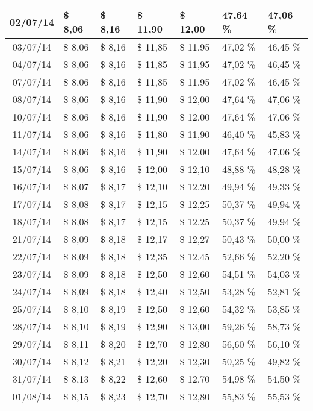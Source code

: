 \begin{center}
\begin{longtable}{|c|p{1.5cm}|p{1.5cm}|p{1.5cm}|p{1.5cm}|p{1.5cm}|p{1.5cm}|}
02/07/14 & \$ 8,06 & \$ 8,16 & \$ 11,90 & \$ 12,00 & 47,64 \% & 47,06 \% \\ \hline
03/07/14 & \$ 8,06 & \$ 8,16 & \$ 11,85 & \$ 11,95 & 47,02 \% & 46,45 \% \\ \hline
04/07/14 & \$ 8,06 & \$ 8,16 & \$ 11,85 & \$ 11,95 & 47,02 \% & 46,45 \% \\ \hline
07/07/14 & \$ 8,06 & \$ 8,16 & \$ 11,85 & \$ 11,95 & 47,02 \% & 46,45 \% \\ \hline
08/07/14 & \$ 8,06 & \$ 8,16 & \$ 11,90 & \$ 12,00 & 47,64 \% & 47,06 \% \\ \hline
10/07/14 & \$ 8,06 & \$ 8,16 & \$ 11,90 & \$ 12,00 & 47,64 \% & 47,06 \% \\ \hline
11/07/14 & \$ 8,06 & \$ 8,16 & \$ 11,80 & \$ 11,90 & 46,40 \% & 45,83 \% \\ \hline
14/07/14 & \$ 8,06 & \$ 8,16 & \$ 11,90 & \$ 12,00 & 47,64 \% & 47,06 \% \\ \hline
15/07/14 & \$ 8,06 & \$ 8,16 & \$ 12,00 & \$ 12,10 & 48,88 \% & 48,28 \% \\ \hline
16/07/14 & \$ 8,07 & \$ 8,17 & \$ 12,10 & \$ 12,20 & 49,94 \% & 49,33 \% \\ \hline
17/07/14 & \$ 8,08 & \$ 8,17 & \$ 12,15 & \$ 12,25 & 50,37 \% & 49,94 \% \\ \hline
18/07/14 & \$ 8,08 & \$ 8,17 & \$ 12,15 & \$ 12,25 & 50,37 \% & 49,94 \% \\ \hline
21/07/14 & \$ 8,09 & \$ 8,18 & \$ 12,17 & \$ 12,27 & 50,43 \% & 50,00 \% \\ \hline
22/07/14 & \$ 8,09 & \$ 8,18 & \$ 12,35 & \$ 12,45 & 52,66 \% & 52,20 \% \\ \hline
23/07/14 & \$ 8,09 & \$ 8,18 & \$ 12,50 & \$ 12,60 & 54,51 \% & 54,03 \% \\ \hline
24/07/14 & \$ 8,09 & \$ 8,18 & \$ 12,40 & \$ 12,50 & 53,28 \% & 52,81 \% \\ \hline
25/07/14 & \$ 8,10 & \$ 8,19 & \$ 12,50 & \$ 12,60 & 54,32 \% & 53,85 \% \\ \hline
28/07/14 & \$ 8,10 & \$ 8,19 & \$ 12,90 & \$ 13,00 & 59,26 \% & 58,73 \% \\ \hline
29/07/14 & \$ 8,11 & \$ 8,20 & \$ 12,70 & \$ 12,80 & 56,60 \% & 56,10 \% \\ \hline
30/07/14 & \$ 8,12 & \$ 8,21 & \$ 12,20 & \$ 12,30 & 50,25 \% & 49,82 \% \\ \hline
31/07/14 & \$ 8,13 & \$ 8,22 & \$ 12,60 & \$ 12,70 & 54,98 \% & 54,50 \% \\ \hline
01/08/14 & \$ 8,15 & \$ 8,23 & \$ 12,70 & \$ 12,80 & 55,83 \% & 55,53 \% \\ \hline

\end{longtable}
\end{center}
